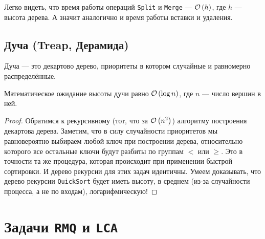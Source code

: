 \begin{note} 
Легко видеть, что время работы операций \texttt{Split} и \texttt{Merge} --- $\mathcal{O}\left(h\right)$, где $h$ --- высота дерева. А значит аналогично и время работы вставки и удаления.
\end{note}

\subsection{Дуча (Treap, Дерамида)}

\begin{defn}
Дуча --- это декартово дерево, приоритеты в котором случайные и равномерно распределённые.
\end{defn}
\begin{lem}
Математическое ожидание высоты дучи равно $\mathcal{O}\left(\log{n}\right)$, где $n$ --- число вершин в ней.
\end{lem}
\begin{proof}
Обратимся к рекурсивному (тот, что за $\mathcal{O}\left(n^2\right)$) алгоритму построения декартова дерева. Заметим, что в силу случайности приоритетов мы равновероятно выбираем любой ключ при построении дерева, относительно которого все остальные ключи будут разбиты по группам $<$ или $\geq$. Это в точности та же процедура, которая происходит при применении быстрой сортировки. И дерево рекурсии для этих задач идентичны. Умеем доказывать, что дерево рекурсии \texttt{QuickSort} будет иметь высоту, в среднем (из-за случайности процесса, а не по входам), логарифмическую! 
\end{proof}

\section{Задачи \texttt{RMQ} и \texttt{LCA}}

